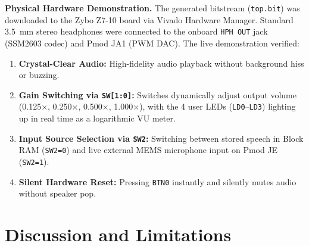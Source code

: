 \documentclass[11pt,a4paper]{article}
\begin{document}
\textbf{Physical Hardware Demonstration.} The generated bitstream (\texttt{top.bit}) was downloaded to the Zybo Z7-10 board via Vivado Hardware Manager. Standard 3.5~mm stereo headphones were connected to the onboard \texttt{HPH OUT} jack (SSM2603 codec) and Pmod JA1 (PWM DAC). The live demonstration verified:
\begin{enumerate}
  \item \textbf{Crystal-Clear Audio:} High-fidelity audio playback without background hiss or buzzing.
  \item \textbf{Gain Switching via \texttt{SW[1:0]}:} Switches dynamically adjust output volume (0.125$\times$, 0.250$\times$, 0.500$\times$, 1.000$\times$), with the 4 user LEDs (\texttt{LD0}--\texttt{LD3}) lighting up in real time as a logarithmic VU meter.
  \item \textbf{Input Source Selection via \texttt{SW2}:} Switching between stored speech in Block RAM (\texttt{SW2=0}) and live external MEMS microphone input on Pmod JE (\texttt{SW2=1}).
  \item \textbf{Silent Hardware Reset:} Pressing \texttt{BTN0} instantly and silently mutes audio without speaker pop.
\end{enumerate}

\section{Discussion and Limitations}
\label{sec:discussion}
\end{document}
